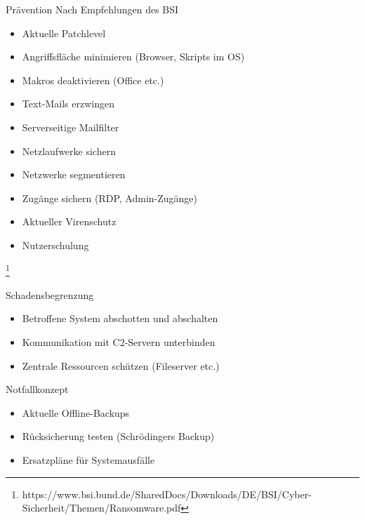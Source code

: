 \documentclass[10pt]{beamer}
\begin{document}
\begin{frame}{Prävention}
	Nach Empfehlungen des BSI
	\begin{itemize}
		\item Aktuelle Patchlevel
		\item Angriffsfläche minimieren (Browser, Skripts im OS)
		\item Makros deaktivieren (Office etc.)
		\item Text-Mails erzwingen
		\item Serverseitige Mailfilter
		\item Netzlaufwerke sichern
		\item Netzwerke segmentieren
		\item Zugänge sichern (RDP, Admin-Zugänge)
		\item Aktueller Virenschutz 
		\item Nutzerschulung
	\end{itemize}
	\let\thefootnote\relax\footnote{https://www.bsi.bund.de/SharedDocs/Downloads/DE/BSI/Cyber-Sicherheit/Themen/Ransomware.pdf}
\end{frame}

\begin{frame}{Schadensbegrenzung}
	\begin{itemize}
		\item Betroffene System abschotten und abschalten
		\item Kommunikation mit C2-Servern unterbinden
		\item Zentrale Ressourcen schützen (Fileserver etc.)
	\end{itemize}
\end{frame}

\begin{frame}{Notfallkonzept}
	\begin{itemize}
		\item Aktuelle Offline-Backups
		\item Rücksicherung testen (Schrödingers Backup)
						
		\item Ersatzpläne für Systemausfälle
 	\end{itemize}

\end{frame}


{\1
\begin{frame}
\end{frame}}
\end{document}
